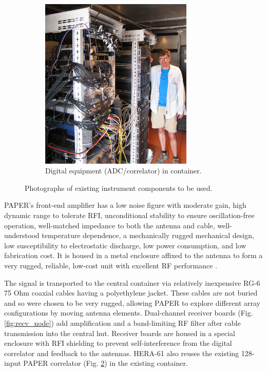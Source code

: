 \documentclass[preprint]{aastex}
\begin{document}
\begin{figure}[h]
\begin{subfigure}[b]{0.3\textwidth}
		\includegraphics[width=0.8\textwidth]{plots/digital.png}
		\caption{Digital equipment (ADC/correlator) in container.}
		\label{fig:digital} 
	\end{subfigure}
	\caption{Photographs of existing instrument components to be used.}
\end{figure}

PAPER's front-end amplifier has a low noise figure with
moderate gain, high dynamic range to tolerate RFI, unconditional
stability to ensure oscillation-free operation, well-matched impedance
to both the antenna and cable, well-understood temperature
dependence, a mechanically rugged mechanical design, low
susceptibility to electrostatic discharge, low power consumption, and
low fabrication cost.  It is housed in a metal enclosure affixed to
the antenna to form a very rugged, reliable, low-cost unit with
excellent RF performance \citep{parsons_et_al2010}.

The signal is transported to the central container via relatively
inexpensive RG-6 75 Ohm coaxial cables having a polyethylene jacket.
These cables are not buried and so were chosen to be very rugged,
allowing
PAPER to explore different array configurations by moving antenna elements.
Dual-channel receiver boards (Fig. \ref{fig:recv_node}) add
amplification and a band-limiting RF filter after cable transmission
into the central hut.  Receiver boards are housed in a special
enclosure with RFI shielding to prevent self-interference from the
digital correlator and feedback to the antennas.
HERA-61 also reuses the existing 128-input PAPER correlator (Fig. \ref{fig:digital})
in the existing container.
\end{document}
